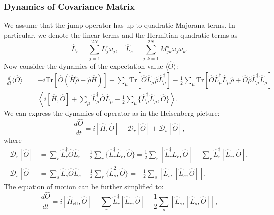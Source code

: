 \subsubsection*{Dynamics of Covariance Matrix}

We assume that the jump operator has up to quadratic Majorana terms. 
In particular, we denote the linear terms and the Hermitian quadratic terms as
\begin{equation}
	\hat L_r = \sum_{j=1}^{2N} L^r_{j} \omega_j, \quad
	\hat L_s = \sum_{j,k=1}^{2N} M^s_{jk} \omega_j \omega_k.
\end{equation}
Now consider the dynamics of the expectation value $\langle\hat O\rangle$:
\begin{equation}
\begin{aligned}
	\frac{d}{dt}\langle \hat O\rangle
	&= -i \mathrm{Tr} [\hat O (\hat H \hat\rho-\hat\rho \hat H)] 
		+ \sum_\mu \mathrm{Tr}[\hat O \hat L_\mu \hat\rho \hat L_\mu^\dagger]
		- \frac{1}{2}\sum_\mu \mathrm{Tr}[\hat O \hat L_\mu^\dagger \hat L_\mu \hat\rho
		+ \hat O \hat\rho \hat L_\mu^\dagger \hat L_\mu] \\
	&= \left\langle
		i[\hat H, \hat O] + \sum_\mu \hat L_\mu^\dagger \hat O\hat L_\mu - \frac{1}{2} \sum_\mu\{\hat L_\mu^\dagger \hat L_\mu, \hat O \}
		\right\rangle.
\end{aligned}
\end{equation}
We can express the dynamics of operator as in the Heisenberg picture:
\begin{equation}
	\frac{d\hat O}{dt} = i[\hat H, \hat O] + \mathcal D_r[\hat O] + \mathcal D_s[\hat O],
\end{equation}
where
\begin{equation}
\begin{aligned}
	\mathcal D_r[\hat O] 
	&= \sum_r \hat L_r^\dagger \hat O\hat L_r - \frac{1}{2} \sum_r\{\hat L_r^\dagger \hat L_r, \hat O \}
	= \frac{1}{2}\sum_r [\hat L_r^\dagger L_r, \hat O] - \sum_r \hat L_r^\dagger[\hat L_r,\hat O],  \\
	\mathcal D_s[\hat O] 
	&= \sum_s \hat L_s \hat O\hat L_s - \frac{1}{2} \sum_r\{\hat L_s^2, \hat O \}
	= -\frac{1}{2} \sum_s [\hat L_s,[\hat L_s,\hat O]].
\end{aligned}
\end{equation}
The equation of motion can be further simplified to:
\begin{equation}
	\frac{d\hat O}{dt} 
	= i[\hat H_{\mathrm{eff}}, \hat O] - \sum_r \hat L_r^\dagger[\hat L_r,\hat O] -\frac{1}{2} \sum_s [\hat L_s,[\hat L_s,\hat O]],
\end{equation}
